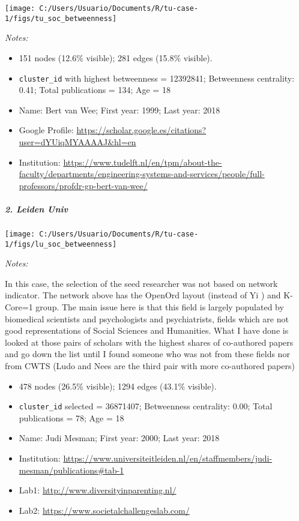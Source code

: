 \documentclass[]{article}
\providecommand{\tightlist}{%
  \setlength{\itemsep}{0pt}\setlength{\parskip}{0pt}}
\let\oldsubparagraph\subparagraph
\renewcommand{\subparagraph}[1]{\oldsubparagraph{#1}\mbox{}}
\begin{document}
\texttt{[image: C:/Users/Usuario/Documents/R/tu-case-1/figs/tu\_soc\_betweenness]}

\emph{Notes:}

\begin{itemize}
\tightlist
\item
  151 nodes (12.6\% visible); 281 edges (15.8\% visible).
\item
  \texttt{cluster\_id} with highest betweenness = 12392841; Betweenness
  centrality: 0.41; Total publications = 134; Age = 18
\item
  Name: Bert van Wee; First year: 1999; Last year: 2018
\item
  Google Profile:
  \url{https://scholar.google.es/citations?user=dYUiqMYAAAAJ\&hl=en}
\item
  Institution:
  \url{https://www.tudelft.nl/en/tpm/about-the-faculty/departments/engineering-systems-and-services/people/full-professors/profdr-gp-bert-van-wee/}
\end{itemize}

\hypertarget{leiden-univ-2}{%
\subparagraph{2. Leiden Univ}\label{leiden-univ-2}}

\texttt{[image: C:/Users/Usuario/Documents/R/tu-case-1/figs/lu\_soc\_betweenness]}

\emph{Notes:}

In this case, the selection of the seed researcher was not based on
network indicator. The network above has the OpenOrd layout (instead of
Yi ) and K-Core=1 group. The main issue here is that this field is
largely populated by biomedical scientists and psychologists and
psychiatrists, fields which are not good representations of Social
Sciences and Humanities. What I have done is looked at those pairs of
scholars with the highest shares of co-authored papers and go down the
list until I found someone who was not from these fields nor from CWTS
(Ludo and Nees are the third pair with more co-authored papers)

\begin{itemize}
\tightlist
\item
  478 nodes (26.5\% visible); 1294 edges (43.1\% visible).
\item
  \texttt{cluster\_id} selected = 36871407; Betweenness centrality:
  0.00; Total publications = 78; Age = 18
\item
  Name: Judi Mesman; First year: 2000; Last year: 2018
\item
  Institution:
  \url{https://www.universiteitleiden.nl/en/staffmembers/judi-mesman/publications\#tab-1}
\item
  Lab1: \url{http://www.diversityinparenting.nl/}
\item
  Lab2: \url{https://www.societalchallengeslab.com/}
\end{itemize}
\end{document}
